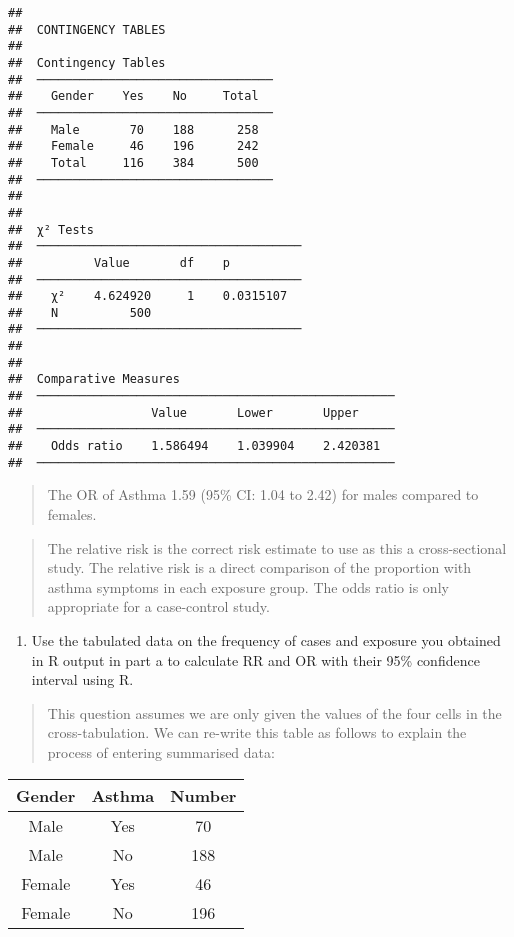 \documentclass[
]{memoir}
\providecommand{\tightlist}{%
  \setlength{\itemsep}{0pt}\setlength{\parskip}{0pt}}
\begin{document}
\begin{verbatim}
## 
##  CONTINGENCY TABLES
## 
##  Contingency Tables                
##  ───────────────────────────────── 
##    Gender    Yes    No     Total   
##  ───────────────────────────────── 
##    Male       70    188      258   
##    Female     46    196      242   
##    Total     116    384      500   
##  ───────────────────────────────── 
## 
## 
##  χ² Tests                              
##  ───────────────────────────────────── 
##          Value       df    p           
##  ───────────────────────────────────── 
##    χ²    4.624920     1    0.0315107   
##    N          500                      
##  ───────────────────────────────────── 
## 
## 
##  Comparative Measures                               
##  ────────────────────────────────────────────────── 
##                  Value       Lower       Upper      
##  ────────────────────────────────────────────────── 
##    Odds ratio    1.586494    1.039904    2.420381   
##  ──────────────────────────────────────────────────
\end{verbatim}

\begin{quote}
The OR of Asthma 1.59 (95\% CI: 1.04 to 2.42) for males compared to females.
\end{quote}

\begin{quote}
The relative risk is the correct risk estimate to use as this a cross-sectional study. The relative risk is a direct comparison of the proportion with asthma symptoms in each exposure group. The odds ratio is only appropriate for a case-control study.
\end{quote}

\begin{enumerate}
\def\labelenumi{\alph{enumi})}
\setcounter{enumi}{1}
\tightlist
\item
  Use the tabulated data on the frequency of cases and exposure you obtained in R output in part a to calculate RR and OR with their 95\% confidence interval using R.
\end{enumerate}

\begin{quote}
This question assumes we are only given the values of the four cells in the cross-tabulation. We can re-write this table as follows to explain the process of entering summarised data:
\end{quote}

\begin{longtable}[]{@{}ccc@{}}
\toprule()
Gender & Asthma & Number \\
\midrule()
\endhead
Male & Yes & 70 \\
Male & No & 188 \\
Female & Yes & 46 \\
Female & No & 196 \\
\bottomrule()
\end{longtable}
\end{document}
